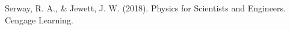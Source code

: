 
\begin{thebibliography}{12}

Serway, R. A., & Jewett, J. W. (2018). Physics for Scientists and Engineers. Cengage Learning.

\end{thebibliography}


